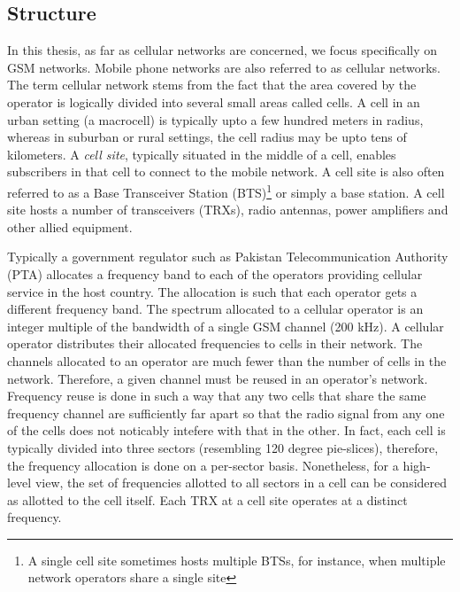 \subsection{Structure} %
In this thesis, as far as cellular networks are concerned, we focus specifically on GSM networks. Mobile phone networks are also referred to as cellular networks. The term cellular network stems from the fact that the area covered by the operator is logically divided into several small areas called cells. A cell in an urban setting (a macrocell) is typically upto a few hundred meters in radius, whereas in suburban or rural settings, the cell radius may be upto tens of kilometers. A \textit{cell site}, typically situated in the middle of a cell, enables subscribers in that cell to connect to the mobile network. A cell site is also often referred to as a Base Transceiver Station (BTS)\footnote{A single cell site sometimes hosts multiple BTSs, for instance, when multiple network operators share a single site} or simply a base station. A cell site hosts a number of transceivers (TRXs), radio antennas, power amplifiers and other allied equipment. 

Typically a government regulator such as Pakistan Telecommunication Authority (PTA) allocates a frequency band to each of the operators providing cellular service in the host country. The allocation is such that each operator gets a different frequency band. The spectrum allocated to a cellular operator is an integer multiple of the bandwidth of a single GSM channel (200 kHz). A cellular operator distributes their allocated frequencies to cells in their network. The channels allocated to an operator are much fewer than the number of cells in the network. Therefore, a given channel must be reused in an operator's network. Frequency reuse is done in such a way that any two cells that share the same frequency channel are sufficiently far apart so that the radio signal from any one of the cells does not noticably intefere with that in the other. In fact, each cell is typically divided into three sectors (resembling 120 degree pie-slices), therefore, the frequency allocation is done on a per-sector basis. Nonetheless, for a high-level view, the set of frequencies allotted to all sectors in a cell can be considered as allotted to the cell itself. Each TRX at a cell site operates at a distinct frequency.

